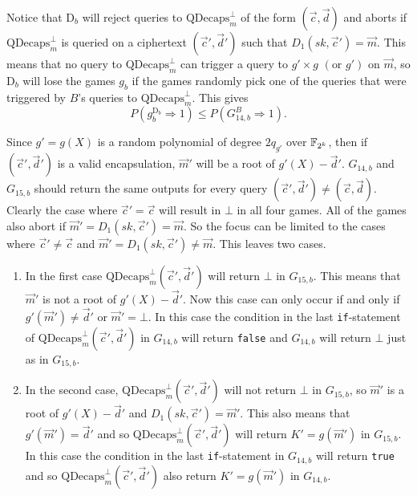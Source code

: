 Notice that $\mathrm{D}_b$ will reject queries to $\mathrm{QDecaps}^{\bot}_m$ of the form $\left(\vec{c}, \vec{d}\right)$ and aborts if $\mathrm{QDecaps}^{\bot}_m$ is queried on a ciphertext $\left(\vec{c}', \vec{d}'\right)$ such that $D_1\left(sk, \vec{c}'\right) = \vec{m}$. This means that no query to $\mathrm{QDecaps}^{\bot}_m$ can trigger a query to $g' \times g$ $\left(\text{or }g'\right)$ on $\vec{m}$, so $\mathrm{D}_b$ will lose the games $g_b$ if the games randomly pick one of the queries that were triggered by $B$'s queries to $\mathrm{QDecaps}^{\bot}_m$. This gives
\[
	P\left( g^{\mathrm{D}_b}_b \Rightarrow 1 \right) \leq P\left( G^B_{14,b} \Rightarrow 1 \right).
\]

Since $g' = g\left(X\right)$ is a random polynomial of degree $2q_{g'}$ over $\mathbb{F}_{2^k}$, then if $\left(\vec{c}', \vec{d}'\right)$ is a valid encapsulation, $\vec{m}'$ will be a root of $g'\left(X\right) - \vec{d}'$. $G_{14,b}$ and $G_{15,b}$ should return the same outputs for every query $\left(\vec{c}', \vec{d}'\right) \neq \left(\vec{c}, \vec{d}\right)$. Clearly the case where $\vec{c}' = \vec{c}$ will result in $\bot$ in all four games. All of the games also abort if $\vec{m}' = D_1\left(sk, \vec{c}'\right) = \vec{m}$. So the focus can be limited to the cases where $\vec{c}' \neq \vec{c}$ and $\vec{m}' = D_1\left(sk, \vec{c}'\right) \neq \vec{m}$. This leaves two cases.

\begin{enumerate}
	\item In the first case $\mathrm{QDecaps}^{\bot}_m\left(\vec{c}', \vec{d}'\right)$ will return $\bot$ in $G_{15,b}$. This means that $\vec{m}'$ is not a root of $g'\left(X\right) - \vec{d}'$. Now this case can only occur if and only if $g'\left(\vec{m}'\right) \neq \vec{d}'$ or $\vec{m}' = \bot$. In this case the condition in the last \texttt{if}-statement of $\mathrm{QDecaps}^{\bot}_m\left(\vec{c}', \vec{d}'\right)$ in $G_{14,b}$ will return \texttt{false} and $G_{14,b}$ will return $\bot$ just as in $G_{15,b}$.
	\item In the second case, $\mathrm{QDecaps}^{\bot}_m\left(\vec{c}', \vec{d}'\right)$ will not return $\bot$ in $G_{15,b}$, so $\vec{m}'$ is a root of $g'\left(X\right) - \vec{d}'$ and $D_1\left(sk, \vec{c}'\right) = \vec{m}'$. This also means that $g'\left(\vec{m}'\right) = \vec{d}'$ and so $\mathrm{QDecaps}^{\bot}_m\left(\vec{c}', \vec{d}'\right)$ will return $K' = g\left(\vec{m}'\right)$ in $G_{15,b}$. In this case the condition in the last \texttt{if}-statement in $G_{14,b}$ will return \texttt{true} and so $\mathrm{QDecaps}^{\bot}_m\left(\vec{c}', \vec{d}'\right)$ also return $K' = g\left(\vec{m}'\right)$ in $G_{14,b}$.
\end{enumerate}

